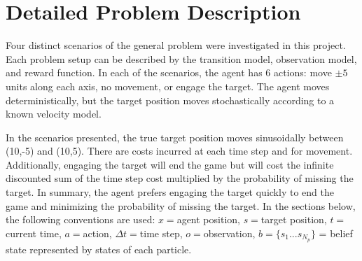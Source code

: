 \section{Detailed Problem Description \label{sec:problem}}
	Four distinct scenarios of the general problem were investigated in this project.  Each problem setup can be described by the transition model, observation model, and reward function. In each of the scenarios, the agent has 6 actions: move $\pm5$ units along each axis, no movement, or engage the target. The agent moves deterministically, but the target position moves stochastically according to a known velocity model.
	
	In the scenarios presented, the true target position moves sinusoidally between (10,-5) and (10,5). There are costs incurred at each time step and for movement. Additionally, engaging the target will end the game but will cost the infinite discounted sum of the time step cost multiplied by the probability of missing the target. In summary, the agent prefers engaging the target quickly to end the game and minimizing the probability of missing the target. In the sections below, the following conventions are used: $x = $agent position, $s = $target position, $t = $current time, $a = $action, $\Delta t = $time step, $o = $observation, $b = \{s_1 ... s_{N_p} \}$ = belief state represented by states of each particle.


